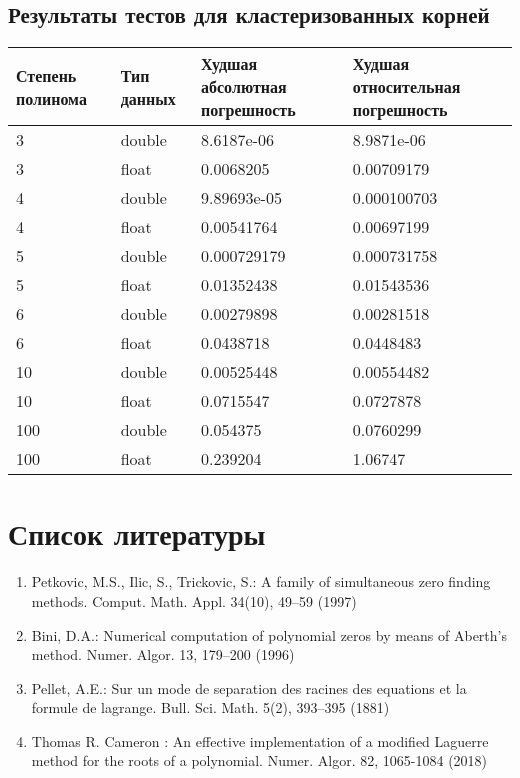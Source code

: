 \documentclass[a4paper,12pt]{article}
\begin{document}
\subsection{Результаты тестов для кластеризованных корней}
\begin{center}
  \begin{tabular}{|p{2.5cm}|p{3.0cm}|p{5.0cm}|p{5.0cm}|}
  \hline
  \textbf{Степень полинома}  & \textbf{Тип данных} & \textbf{Худшая абсолютная погрешность} & \textbf{Худшая относительная погрешность} \\
  \hline
  3 & double & 8.6187e-06 & 8.9871e-06 \\
  \hline
  3 & float & 0.0068205 & 0.00709179 \\
  \hline
  4 & double & 9.89693e-05 & 0.000100703 \\
  \hline
  4 & float & 0.00541764 & 0.00697199 \\
  \hline
  5 & double & 0.000729179 & 0.000731758 \\
  \hline
  5 & float & 0.01352438 & 0.01543536 \\
  \hline
  6 & double & 0.00279898 & 0.00281518 \\
  \hline
  6 & float & 0.0438718 & 0.0448483 \\
  \hline
  10 & double & 0.00525448 & 0.00554482 \\
  \hline
  10 & float & 0.0715547 & 0.0727878 \\
  \hline
  100 & double & 0.054375 & 0.0760299 \\
  \hline
  100 & float & 0.239204 & 1.06747 \\
  \hline
\end{tabular}
\label{tab:my_label_2}
\end{center}

\newpage
\section{Список литературы}
\begin{enumerate}
    \item Petkovic, M.S., Ilic, S., Trickovic, S.: A family of simultaneous zero finding methods. Comput. Math. Appl. 34(10), 49–59 (1997)
    \item Bini, D.A.: Numerical computation of polynomial zeros by means of Aberth’s method. Numer. Algor. 13, 179–200 (1996)
    \item Pellet, A.E.: Sur un mode de separation des racines des equations et la formule de lagrange. Bull. Sci. Math. 5(2), 393–395 (1881)
    \item Thomas R. Cameron : An effective implementation of a modified Laguerre
    method for the roots of a polynomial. Numer. Algor. 82, 1065-1084 (2018)
\end{enumerate}
\end{document}
